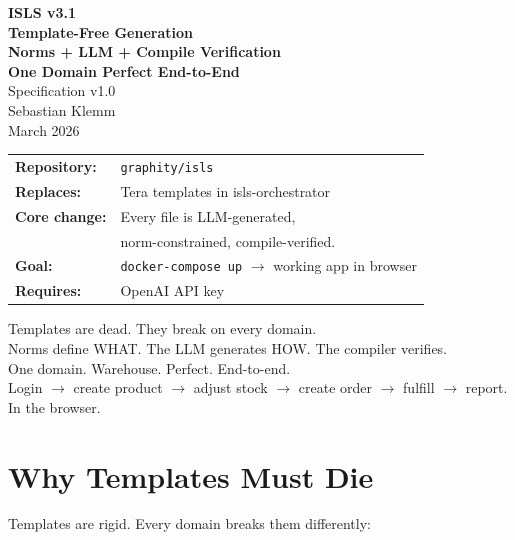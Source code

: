 \documentclass[11pt,a4paper]{article}
\begin{document}
\begin{titlepage}
\begin{center}
\vspace*{1.5cm}
{\Huge\bfseries ISLS v3.1}\\[0.4cm]
{\LARGE\bfseries Template-Free Generation}\\[0.3cm]
{\LARGE\bfseries Norms + LLM + Compile Verification}\\[0.3cm]
{\LARGE\bfseries One Domain Perfect End-to-End}\\[1.2cm]
{\Large Specification v1.0}\\[1.5cm]
{\large Sebastian Klemm}\\[0.3cm]
{\small March 2026}\\[2cm]

\begin{tabular}{ll}
\textbf{Repository:} & \texttt{graphity/isls} \\
\textbf{Replaces:} & Tera templates in isls-orchestrator \\
\textbf{Core change:} & Every file is LLM-generated, \\
 & norm-constrained, compile-verified. \\
\textbf{Goal:} & \texttt{docker-compose up} $\to$ working app in browser \\
\textbf{Requires:} & OpenAI API key \\
\end{tabular}

\vfill
{\small
Templates are dead. They break on every domain.\\
Norms define WHAT. The LLM generates HOW. The compiler verifies.\\
One domain. Warehouse. Perfect. End-to-end.\\
Login $\to$ create product $\to$ adjust stock $\to$ create order $\to$
fulfill $\to$ report. In the browser.
}
\end{center}
\end{titlepage}

\tableofcontents
\newpage

\section{Why Templates Must Die}

Templates are rigid. Every domain breaks them differently:
\end{document}
